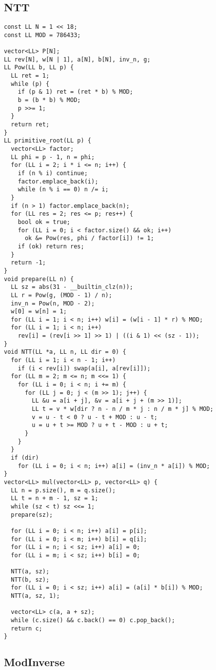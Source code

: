 \documentclass[FSZ,a4paper,onesided]{article}
\begin{document}
\begin{multicols*}{\COLS}
\subsection{NTT}
\begin{lstlisting}
const LL N = 1 << 18;
const LL MOD = 786433;

vector<LL> P[N];
LL rev[N], w[N | 1], a[N], b[N], inv_n, g;
LL Pow(LL b, LL p) {
  LL ret = 1;
  while (p) {
    if (p & 1) ret = (ret * b) % MOD;
    b = (b * b) % MOD;
    p >>= 1;
  }
  return ret;
}
LL primitive_root(LL p) {
  vector<LL> factor;
  LL phi = p - 1, n = phi;
  for (LL i = 2; i * i <= n; i++) {
    if (n % i) continue;
    factor.emplace_back(i);
    while (n % i == 0) n /= i;
  }
  if (n > 1) factor.emplace_back(n);
  for (LL res = 2; res <= p; res++) {
    bool ok = true;
    for (LL i = 0; i < factor.size() && ok; i++)
      ok &= Pow(res, phi / factor[i]) != 1;
    if (ok) return res;
  }
  return -1;
}
void prepare(LL n) {
  LL sz = abs(31 - __builtin_clz(n));
  LL r = Pow(g, (MOD - 1) / n);
  inv_n = Pow(n, MOD - 2);
  w[0] = w[n] = 1;
  for (LL i = 1; i < n; i++) w[i] = (w[i - 1] * r) % MOD;
  for (LL i = 1; i < n; i++)
    rev[i] = (rev[i >> 1] >> 1) | ((i & 1) << (sz - 1));
}
void NTT(LL *a, LL n, LL dir = 0) {
  for (LL i = 1; i < n - 1; i++)
    if (i < rev[i]) swap(a[i], a[rev[i]]);
  for (LL m = 2; m <= n; m <<= 1) {
    for (LL i = 0; i < n; i += m) {
      for (LL j = 0; j < (m >> 1); j++) {
        LL &u = a[i + j], &v = a[i + j + (m >> 1)];
        LL t = v * w[dir ? n - n / m * j : n / m * j] % MOD;
        v = u - t < 0 ? u - t + MOD : u - t;
        u = u + t >= MOD ? u + t - MOD : u + t;
      }
    }
  }
  if (dir)
    for (LL i = 0; i < n; i++) a[i] = (inv_n * a[i]) % MOD;
}
vector<LL> mul(vector<LL> p, vector<LL> q) {
  LL n = p.size(), m = q.size();
  LL t = n + m - 1, sz = 1;
  while (sz < t) sz <<= 1;
  prepare(sz);

  for (LL i = 0; i < n; i++) a[i] = p[i];
  for (LL i = 0; i < m; i++) b[i] = q[i];
  for (LL i = n; i < sz; i++) a[i] = 0;
  for (LL i = m; i < sz; i++) b[i] = 0;

  NTT(a, sz);
  NTT(b, sz);
  for (LL i = 0; i < sz; i++) a[i] = (a[i] * b[i]) % MOD;
  NTT(a, sz, 1);

  vector<LL> c(a, a + sz);
  while (c.size() && c.back() == 0) c.pop_back();
  return c;
}
\end{lstlisting}
\subsection{ModInverse}
\begin{lstlisting}


\end{lstlisting}
\end{multicols*}
\end{document}
